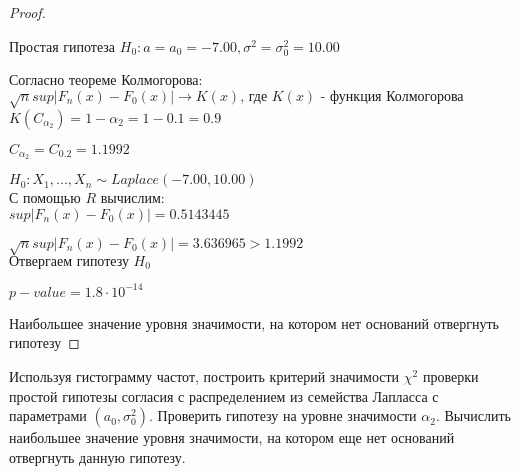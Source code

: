 \begin{proof}
	$ $
	
	Простая гипотеза $H_0: a=a_0=-7.00, \sigma^2=\sigma_0^2=10.00$ 
	
	Согласно теореме Колмогорова: \\

		$\sqrt{n}sup|F_n(x)-F_0(x)|\rightarrow K(x)\text{, где $K(x)$ - функция Колмогорова}$ \\

		$K(C_{\alpha_2})=1-\alpha_2=1-0.1=0.9$ 
		
		$C_{\alpha_2}=C_{0.2}=1.1992$
		
		$H_0: X_1, ..., X_n\sim Laplace(-7.00, 10.00)$ \\

	С помощью $R$ вычислим: \\

		$sup|F_n(x)-F_0(x)| = 0.5143445$ 
		
		$\sqrt{n}sup|F_n(x)-F_0(x)| = 3.636965 > 1.1992$ \\
		
		$\text{Отвергаем гипотезу } H_0$ 
		
		$p-value = 1.8 \cdot 10^{-14}$ 

	Наибольшее значение уровня значимости, на котором нет оснований отвергнуть гипотезу
\end{proof}


\begin{problem}
	Используя гистограмму частот, построить критерий значимости $\chi^2$ проверки простой гипотезы согласия с распределением из семейства Лапласса с параметрами $(a_0, \sigma_0^2)$. Проверить гипотезу на уровне значимости $\alpha_2$. Вычислить наибольшее значение уровня значимости, на котором еще нет оснований отвергнуть данную гипотезу. 
\end{problem}


